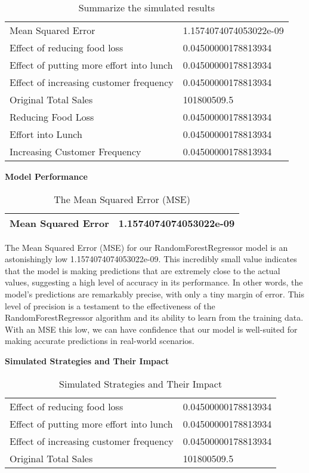 \begin{table}[H]
	\centering
	\begin{tabular}{ll}
		\toprule
			Mean Squared Error & 1.1574074074053022e-09 \\
			Effect of reducing food loss & 0.04500000178813934 \\
			Effect of putting more effort into lunch & 0.04500000178813934 \\
			Effect of increasing customer frequency & 0.04500000178813934 \\
			Original Total Sales & 101800509.5 \\
			Reducing Food Loss & 0.04500000178813934 \\
			Effort into Lunch & 0.04500000178813934 \\
			Increasing Customer Frequency & 0.04500000178813934 \\
		\bottomrule
	\end{tabular}
	\caption{Summarize the simulated results}
	\label{tab:summarize_the_simulated_results}
\end{table}

\textbf{Model Performance} 

\begin{table}[H]
	\centering
	\begin{tabular}{ll}
		\toprule
			Mean Squared Error & 1.1574074074053022e-09 \\
		\bottomrule
	\end{tabular}
	\caption{The Mean Squared Error (MSE)}
	\label{tab:the_mean_squared_error}
\end{table}

The Mean Squared Error (MSE) for our RandomForestRegressor model is an astonishingly low 1.1574074074053022e-09. This incredibly small value indicates that the model is making predictions that are extremely close to the actual values, suggesting a high level of accuracy in its performance. In other words, the model's predictions are remarkably precise, with only a tiny margin of error. This level of precision is a testament to the effectiveness of the RandomForestRegressor algorithm and its ability to learn from the training data. With an MSE this low, we can have confidence that our model is well-suited for making accurate predictions in real-world scenarios.

\textbf{Simulated Strategies and Their Impact}

\begin{table}[H]
	\centering
	\begin{tabular}{ll}
		\toprule
			Effect of reducing food loss & 0.04500000178813934 \\
			Effect of putting more effort into lunch & 0.04500000178813934 \\
			Effect of increasing customer frequency & 0.04500000178813934 \\
			Original Total Sales & 101800509.5 \\
		\bottomrule
	\end{tabular}
	\caption{Simulated Strategies and Their Impact}
	\label{tab:simulated_strategies_and_their_impact}
\end{table}

